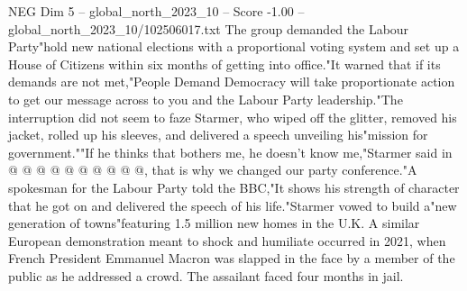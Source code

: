 \begin{textsample}{NEG Dim 5 – global\_north\_2023\_10 – Score -1.00 – global\_north\_2023\_10/102506017.txt}
The group demanded the Labour Party"hold new national elections with a proportional voting system and set up a House of Citizens within six months of getting into office."It warned that if its demands are not met,"People Demand Democracy will take proportionate action to get our message across to you and the Labour Party leadership."The interruption did not seem to faze Starmer, who wiped off the glitter, removed his jacket, rolled up his sleeves, and delivered a speech unveiling his"mission for government.""If he thinks that bothers me, he doesn't know me,"Starmer said in @ @ @ @ @ @ @ @ @ @, that is why we changed our party conference."A spokesman for the Labour Party told the BBC,"It shows his strength of character that he got on and delivered the speech of his life."Starmer vowed to build a"new generation of towns"featuring 1.5 million new homes in the U.K.
A similar European demonstration meant to shock and humiliate occurred in 2021, when French President Emmanuel Macron was slapped in the face by a member of the public as he addressed a crowd.
The assailant faced four months in jail.

\end{textsample}
